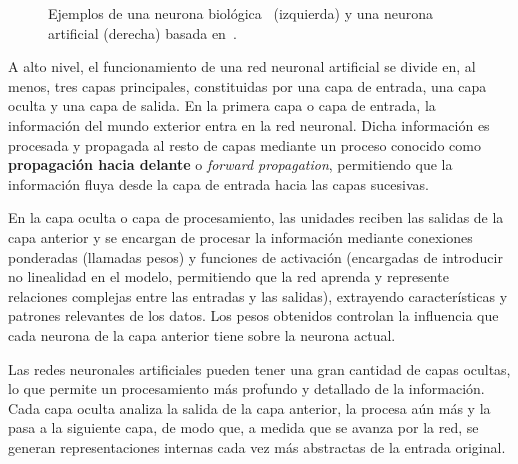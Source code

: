 \begin{figure}[h]
    \centering
    \hfill
    \caption[Ejemplos de neurona biológica~\cite{Neves2018} y neurona artificial (basada en~\cite{Li2024}).]{Ejemplos de una neurona biológica~\cite{Neves2018} (izquierda) y una neurona artificial (derecha) basada en~\cite{Li2024}.}\label{fig:neuronasbioyartificial}
\end{figure}

A alto nivel, el funcionamiento de una red neuronal artificial se divide en, al menos, tres capas principales, constituidas por una capa de entrada, una capa oculta y una capa de salida. En la primera capa o capa de entrada, la información del mundo exterior entra en la red neuronal. Dicha información es procesada y propagada al resto de capas mediante un proceso conocido como \textbf{propagación hacia delante} o \emph{forward propagation}, permitiendo que la información fluya desde la capa de entrada hacia las capas sucesivas.

En la capa oculta o capa de procesamiento, las unidades reciben las salidas de la capa anterior y se encargan de procesar la información mediante conexiones ponderadas (llamadas pesos) y funciones de activación (encargadas de introducir no linealidad en el modelo, permitiendo que la red aprenda y represente relaciones complejas entre las entradas y las salidas), extrayendo características y patrones relevantes de los datos. Los pesos obtenidos controlan la influencia que cada neurona de la capa anterior tiene sobre la neurona actual.

Las redes neuronales artificiales pueden tener una gran cantidad de capas ocultas, lo que permite un procesamiento más profundo y detallado de la información. Cada capa oculta analiza la salida de la capa anterior, la procesa aún más y la pasa a la siguiente capa, de modo que, a medida que se avanza por la red, se generan representaciones internas cada vez más abstractas de la entrada original.

